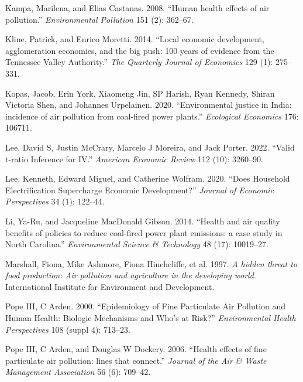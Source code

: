 \documentclass[
]{article}
\newlength{\cslhangindent}
\newlength{\cslentryspacingunit} %
\newenvironment{CSLReferences}[2] %
 {%
  \setlength{\parindent}{0pt}
  \ifodd #1
  \let\oldpar\par
  \def\par{\hangindent=\cslhangindent\oldpar}
  \fi
  \setlength{\parskip}{#2\cslentryspacingunit}
 }%
 {}
\begin{document}
\begin{CSLReferences}{1}{0}
\leavevmode{}%
Kampa, Marilena, and Elias Castanas. 2008. {``{Human health effects of air pollution}.''} \emph{{Environmental Pollution}} 151 (2): 362--67.

\leavevmode{}%
Kline, Patrick, and Enrico Moretti. 2014. {``{Local economic development, agglomeration economies, and the big push: 100 years of evidence from the Tennessee Valley Authority}.''} \emph{The Quarterly Journal of Economics} 129 (1): 275--331.

\leavevmode{}%
Kopas, Jacob, Erin York, Xiaomeng Jin, SP Harish, Ryan Kennedy, Shiran Victoria Shen, and Johannes Urpelainen. 2020. {``{Environmental justice in India: incidence of air pollution from coal-fired power plants}.''} \emph{{Ecological Economics}} 176: 106711.

\leavevmode{}%
Lee, David S, Justin McCrary, Marcelo J Moreira, and Jack Porter. 2022. {``{Valid t-ratio Inference for IV}.''} \emph{{American Economic Review}} 112 (10): 3260--90.

\leavevmode{}%
Lee, Kenneth, Edward Miguel, and Catherine Wolfram. 2020. {``Does Household Electrification Supercharge Economic Development?''} \emph{{Journal of Economic Perspectives}} 34 (1): 122--44.

\leavevmode{}%
Li, Ya-Ru, and Jacqueline MacDonald Gibson. 2014. {``{Health and air quality benefits of policies to reduce coal-fired power plant emissions: a case study in North Carolina}.''} \emph{{Environmental Science \& Technology}} 48 (17): 10019--27.

\leavevmode{}%
Marshall, Fiona, Mike Ashmore, Fiona Hinchcliffe, et al. 1997. \emph{{A hidden threat to food production: Air pollution and agriculture in the developing world}}. {International Institute for Environment and Development.}

\leavevmode{}%
Pope III, C Arden. 2000. {``Epidemiology of Fine Particulate Air Pollution and Human Health: Biologic Mechanisms and Who's at Risk?''} \emph{{Environmental Health Perspectives}} 108 (suppl 4): 713--23.

\leavevmode{}%
Pope III, C Arden, and Douglas W Dockery. 2006. {``{Health effects of fine particulate air pollution: lines that connect}.''} \emph{{Journal of the Air \& Waste Management Association}} 56 (6): 709--42.


\end{CSLReferences}
\end{document}
